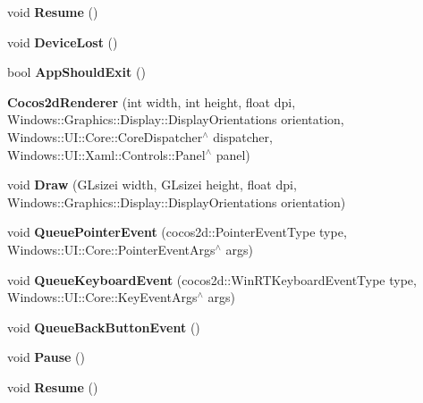 \begin{DoxyCompactItemize}
void {\bfseries Resume} ()
\item 
\mbox{\label{classCocos2dRenderer_a1a81f328457f31a967027be669287b40}} 
void {\bfseries Device\+Lost} ()
\item 
\mbox{\label{classCocos2dRenderer_afc28959fe03cfcfc94175ff5e3b16edd}} 
bool {\bfseries App\+Should\+Exit} ()
\item 
\mbox{\label{classCocos2dRenderer_aebeabf98d4e38453f7b0037f1696298e}} 
{\bfseries Cocos2d\+Renderer} (int width, int height, float dpi, Windows\+::\+Graphics\+::\+Display\+::\+Display\+Orientations orientation, Windows\+::\+U\+I\+::\+Core\+::\+Core\+Dispatcher$^\wedge$ dispatcher, Windows\+::\+U\+I\+::\+Xaml\+::\+Controls\+::\+Panel$^\wedge$ panel)
\item 
\mbox{\label{classCocos2dRenderer_a189eebc46e0296e668d284291833a882}} 
void {\bfseries Draw} (G\+Lsizei width, G\+Lsizei height, float dpi, Windows\+::\+Graphics\+::\+Display\+::\+Display\+Orientations orientation)
\item 
\mbox{\label{classCocos2dRenderer_a18483fe8392de98f6eb608d34a4f9a65}} 
void {\bfseries Queue\+Pointer\+Event} (cocos2d\+::\+Pointer\+Event\+Type type, Windows\+::\+U\+I\+::\+Core\+::\+Pointer\+Event\+Args$^\wedge$ args)
\item 
\mbox{\label{classCocos2dRenderer_ae8bb09c38904a2658c75ab5e6d0ed224}} 
void {\bfseries Queue\+Keyboard\+Event} (cocos2d\+::\+Win\+R\+T\+Keyboard\+Event\+Type type, Windows\+::\+U\+I\+::\+Core\+::\+Key\+Event\+Args$^\wedge$ args)
\item 
\mbox{\label{classCocos2dRenderer_a4c81bf54ee380343b7646e4f65583e58}} 
void {\bfseries Queue\+Back\+Button\+Event} ()
\item 
\mbox{\label{classCocos2dRenderer_aade59afd80ea1bcfb353b67bcf76831d}} 
void {\bfseries Pause} ()
\item 
\mbox{\label{classCocos2dRenderer_ac8016f2e5b35c0bf1e6c2dfe4d076394}} 
void {\bfseries Resume} ()

\end{DoxyCompactItemize}
